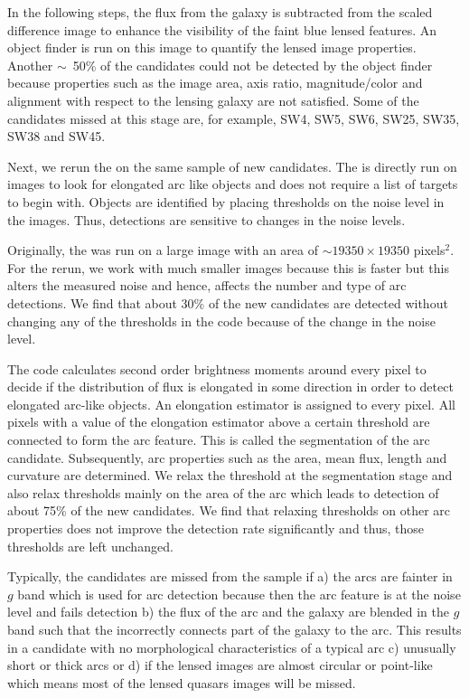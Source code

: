 \documentclass[useAMS,usenatbib,a4paper]{mn2e}
\begin{document}
In the following steps, the flux from the galaxy is subtracted from the
scaled difference image to enhance the visibility of the faint blue
lensed features. An object finder is run on this image to quantify the
lensed image properties. Another $\sim$~50\% of the \sw candidates could not be
detected by the object finder because properties such as the image area,
axis ratio, magnitude/color and alignment with respect to the lensing
galaxy are not satisfied. Some of the candidates missed at this stage
are, for example, SW4, SW5, SW6, SW25, SW35, SW38 and SW45.

Next, we rerun the \af on the same \sw sample of new candidates. The \af
is directly run on images to look for elongated arc like objects and does
not require a list of targets to begin with. Objects are identified by
placing thresholds on the noise level in the images. Thus, \af
detections are sensitive to changes in the noise levels.

Originally, the \af was run on a large image with an area of $\sim 19350
\times 19350$ pixels$^2$. For the rerun, we work with much smaller
images because this is faster but this alters the measured
noise and hence, affects the number and type of arc detections. We find
that about 30\% of the new candidates are detected without changing any
of the thresholds in the code because of the change in the noise level.

The \af code calculates second order brightness moments around every
pixel to decide if the distribution of flux is elongated in some
direction in order to detect elongated arc-like objects. An elongation
estimator is assigned to every pixel. All pixels with a value of the
elongation estimator above a certain threshold are connected to form the arc
feature. This is called the segmentation of the arc candidate. Subsequently, arc
properties such as the area, mean flux, length and curvature are
determined. We relax the threshold at the segmentation stage and also relax
thresholds mainly on the area of the arc which leads to detection of
about 75\% of the new \sw candidates. We find that relaxing thresholds
on other arc properties does not improve the detection rate significantly
and thus, those thresholds are left unchanged.

Typically, the candidates are missed from the \af sample if a) the arcs
are fainter in $g$ band which is used for arc detection because then the
arc feature is at the noise level and fails detection b) the flux of the
arc and the galaxy are blended in the $g$ band such that the \af
incorrectly connects part of the galaxy to the arc. This results in a
candidate with no morphological characteristics of a typical arc c)
unusually short or thick arcs or d) if the lensed images are almost
circular or point-like which means most of the lensed quasars images
will be missed.
\end{document}
